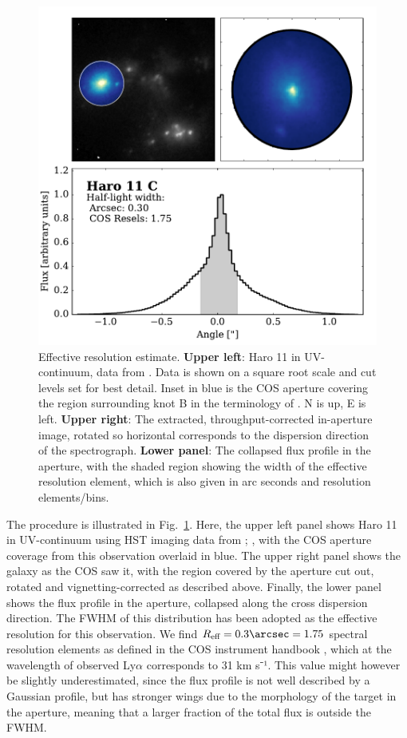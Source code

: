 \documentclass[twocolumn,]{aastex61}
\begin{document}
\begin{figure}
\centering
\includegraphics[width=1.000\hsize]{./EffResol.pdf}
\caption{Effective resolution estimate. \textbf{Upper left}: Haro 11 in
UV-continuum, data from \citet{Ostlin2009, Hayes2009}. Data is
shown on a square root scale and cut levels set for best detail. Inset
in blue is the COS aperture covering the region surrounding knot
B in the terminology of \citet{Vader1993}. N is up, E is left.
\textbf{Upper right}: The extracted, throughput-corrected in-aperture
image, rotated so horizontal corresponds to the dispersion direction of
the spectrograph. \textbf{Lower panel}: The collapsed flux profile in
the aperture, with the shaded region showing the width of the effective
resolution element, which is also given in arc seconds and resolution
elements/bins.}\label{fig:resol}
\end{figure}

The procedure is illustrated in Fig.~\ref{fig:resol}. Here, the upper left panel
shows Haro 11 in UV-continuum using HST imaging data from \citet{Ostlin2009};
\citet{Hayes2009}, with the COS aperture coverage from this observation overlaid
in blue. The upper right panel shows the galaxy as the COS saw it, with the
region covered by the aperture cut out, rotated and vignetting-corrected as
described above.  Finally, the lower panel shows the flux profile in the
aperture, collapsed along the cross dispersion direction. The FWHM of this
distribution has been adopted as the effective resolution for this observation.
We find $R_{\text{eff}} = 0.3 \arcsec = 1.75$ spectral resolution elements as
defined in the COS instrument handbook \cite{CosHandbook}, which at the
wavelength of observed Ly$\alpha$ corresponds to 31 km s⁻¹. This value might
however be slightly underestimated, since the flux profile is not well described
by a Gaussian profile, but has stronger wings due to the morphology of the
target in the aperture, meaning that a larger fraction of the total flux is
outside the FWHM.
\end{document}
